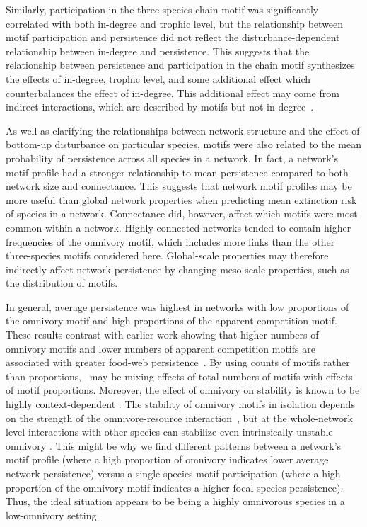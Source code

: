 \documentclass[12pt]{article}
\begin{document}
\begin{spacing}{2.0}
    
    Similarly, participation in the three-species chain motif was significantly correlated with both in-degree and trophic level, but the relationship between motif participation and persistence did not reflect the disturbance-dependent relationship between in-degree and persistence.
    This suggests that the relationship between persistence and participation in the chain motif synthesizes the effects of in-degree, trophic level, and some additional effect which counterbalances the effect of in-degree.
    This additional effect may come from indirect interactions, which are described by motifs but not in-degree~\citep{Cirtwill2018FoodWebs}. 
    
    
    As well as clarifying the relationships between network structure and the effect of bottom-up disturbance on particular species, motifs were also related to the mean probability of persistence across all species in a network.
    In fact, a network's motif profile had a stronger relationship to mean persistence compared to both network size and connectance. 
    This suggests that network motif profiles may be more useful than global network properties when predicting mean extinction risk of species in a network.
    Connectance did, however, affect which motifs were most common within a network. 
    Highly-connected networks tended to contain higher frequencies of the omnivory motif, which includes more links than the other three-species motifs considered here.
    Global-scale properties may therefore indirectly affect network persistence by changing meso-scale properties, such as the distribution of motifs. 
    
    
    In general, average persistence was highest in networks with low proportions of the omnivory motif and high proportions of the apparent competition motif. 
    These results contrast with earlier work showing that higher numbers of omnivory motifs and lower numbers of apparent competition motifs are associated with greater food-web persistence~\citep{Stouffer2010b}.
    By using counts of motifs rather than proportions,~\citet{Stouffer2010b} may be mixing effects of total numbers of motifs with effects of motif proportions.
    Moreover, the effect of omnivory on stability is known to be highly context-dependent \citep{bascompte2005simple, Monteiro2016,McLeod2021}. 
    The stability of omnivory motifs in isolation depends on the strength of the omnivore-resource interaction~\citep{McLeod2021}, but at the whole-network level interactions with other species can stabilize even intrinsically unstable omnivory \citep{Kratina2012}. 
    This might be why we find different patterns between a network's motif profile (where a high proportion of omnivory indicates lower average network persistence) versus a single species motif participation (where a high proportion of the omnivory motif indicates a higher focal species persistence).
    Thus, the ideal situation appears to be being a highly omnivorous species in a low-omnivory setting. 
    

\end{spacing}
\end{document}
